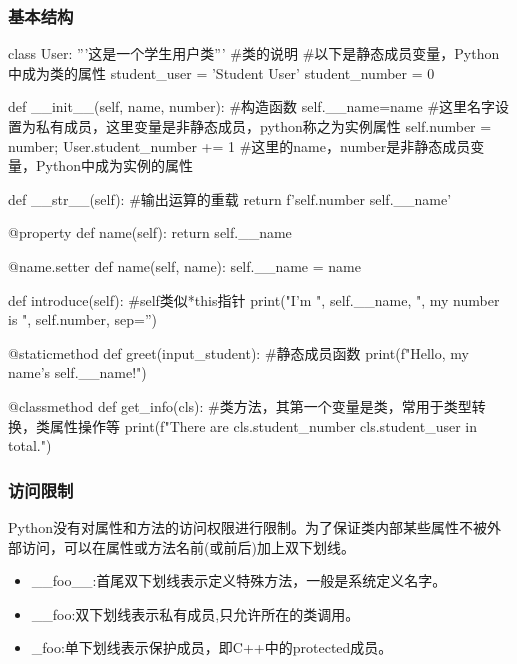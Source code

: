 \documentclass{article}
\begin{document}
      \subsubsection{基本结构}
        \begin{codeblock}[language=python, caption={define a class}]
          class User: 
              '''这是一个学生用户类''' #类的说明
              #以下是静态成员变量，Python中成为类的属性
              student_user = 'Student User' 
              student_number = 0
          
              def __init__(self, name, number): #构造函数
                  self.__name=name #这里名字设置为私有成员，这里变量是非静态成员，python称之为实例属性
                  self.number = number; 
                  User.student_number += 1
                  #这里的name，number是非静态成员变量，Python中成为实例的属性
          
              def __str__(self): #输出运算的重载
                  return f'{self.number} {self.__name}'
          
              @property
              def name(self):
                  return self.__name
          
              @name.setter
              def name(self, name):
                  self.__name = name

              def introduce(self): #self类似*this指针
                  print("I'm ", self.__name, ", my number is ", self.number, sep='')

              @staticmethod
              def greet(input_student): #静态成员函数
                  print(f"Hello, my name's {self.__name}!")

              @classmethod 
              def get_info(cls): #类方法，其第一个变量是类，常用于类型转换，类属性操作等
                  print(f"There are {cls.student_number} {cls.student_user} in total.")
        \end{codeblock}

      \subsubsection{访问限制}
        Python没有对属性和方法的访问权限进行限制。为了保证类内部某些属性不被外部访问，可以在属性或方法名前(或前后)加上双下划线。
        \begin{itemize}
          \item \_\_foo\_\_:首尾双下划线表示定义特殊方法，一般是系统定义名字。
          \item \_\_foo:双下划线表示私有成员,只允许所在的类调用。
          \item \_foo:单下划线表示保护成员，即C++中的protected成员。
        \end{itemize}
\end{document}

